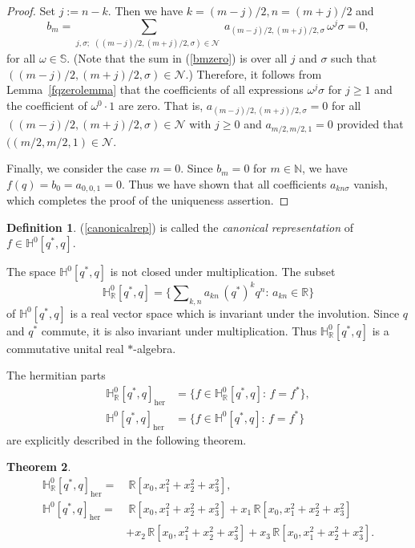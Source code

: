 \documentclass[11pt,a4paper]{amsart}
\newtheorem{theorem}{Theorem}[section]
\theoremstyle{definition}
\newtheorem{definition}[theorem]{Definition}
\begin{document}
\begin{proof}
Set $j:=n-k$. Then we have $k=(m-j)/2, n=(m+j)/2$ and
%
\begin{equation}
\label{bmzero}
b_{m}=\sum _{j,\sigma ;
\substack{((m-j)/2, (m+j)/2,\sigma )\in \mathcal{N}}} a_{(m-j)/2,(m+j)/2,
\sigma}\, \omega ^{j} \sigma = 0,
\end{equation}
%
for all $\omega \in \mathbb{S}$. (Note that the sum in (\ref{bmzero}) is
over all $j$ and $\sigma $ such that
$ ((m-j)/2, (m+j)/2,\sigma )\in \mathcal{N}$.) Therefore, it follows from
Lemma~\ref{fqzerolemma} that the coefficients of all expressions
$\omega ^{j}\sigma $ for $j\geq 1$ and the coefficient of
$\omega ^{0} \cdot 1$ are zero. That is,
$a_{(m-j)/2,(m+j)/2,\sigma}=0$ for all
$ ( (m-j)/2, (m+j)/2,\sigma )\in \mathcal{N}$ with $j\geq 0$ and
$a_{m/2,m/2,1}=0$ provided that $((m/2,m/2,1)\in \mathcal{N}$.

Finally, we consider the case $m=0$. Since $b_{m}=0$ for
$m\in \mathbb{N}$, we have $f(q)=b_{0}=a_{0,0,1}=0$. Thus we have shown
that all coefficients $ a_{kn\sigma}$ vanish, which completes the proof
of the uniqueness assertion.
\end{proof}

\begin{definition}
\label{defn4.4}
(\ref{canonicalrep}) is called the \emph{canonical representation} of
$f\in \mathbb{H}^{0}[q^{*}, q]$.
\end{definition}

The space $ \mathbb{H}^{0}[q^{*}, q]$ is not closed under multiplication.
The subset
%
\begin{equation}
\mathbb{H}^{0}_{\mathbb{R}}[q^{*}, q] = \Big\{ \sum \nolimits _{k,n} a_{kn}
\, (q^{*})^{k} q^{n} : \, a_{kn}\in \mathbb{R}\Big\}
\label{eq24}
\end{equation}
%
of $\mathbb{H}^{0}[q^{*}, q] $ is a real vector space which is invariant
under the involution. Since $q$ and $q^{*}$ commute, it is also invariant
under multiplication. Thus $\mathbb{H}^{0}_{\mathbb{R}}[q^{*}, q]$ is a
commutative unital real $*$-algebra.

The hermitian parts
%
\begin{align*}
\mathbb{H}^{0}_{\mathbb{R}}[q^{*}, q]_{\mathrm{her}} & =\{ f\in
\mathbb{H}^{0}_{\mathbb{R}}[q^{*}, q]: \,f=f^{*}\},
\\
\mathbb{H}^{0}[q^{*}, q]_{\mathrm{her}} & =\{ f\in \mathbb{H}^{0}[q^{*},
q]: \,f=f^{*}\}
\end{align*}
%
are explicitly described in the following theorem.
%
\begin{theorem}%
\label{realpartH_L}
%
\begin{align}
\label{herpart}
\mathbb{H}^{0}_{\mathbb{R}}[q^{*}, q]_{\mathrm{her}} =& ~\mathbb{R}[x_{0},x_{1}^{2}+x_{2}^{2}+x_{3}^{2}],
\\
\mathbb{H}^{0}[q^{*}, q]_{\mathrm{her}} =& ~\mathbb{R}[x_{0},x_{1}^{2}+x_{2}^{2}+x_{3}^{2}]
+ x_{1}\, \mathbb{R}[x_{0},x_{1}^{2}+x_{2}^{2}+x_{3}^{2}]
\label{herpart1}
\\
&+x_{2}\, \mathbb{R}[x_{0},x_{1}^{2}+x_{2}^{2}+x_{3}^{2}]+ x_{3}\,
\mathbb{R}[x_{0},x_{1}^{2}+x_{2}^{2}+x_{3}^{2}].
\nonumber
\end{align}
%
\end{theorem}
\end{document}
